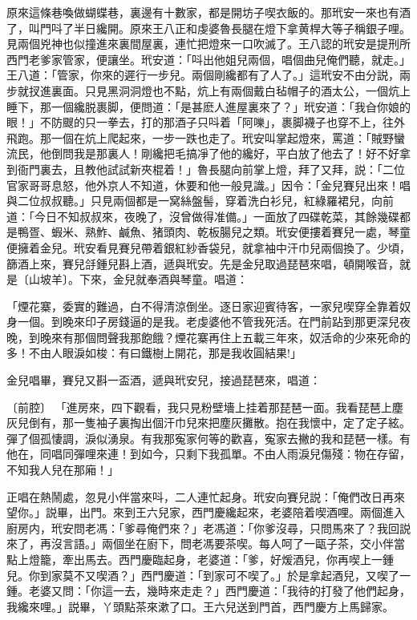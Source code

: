 原來這條巷喚做蝴蝶巷，裏邊有十數家，都是開坊子喫衣飯的。那玳安一來也有酒了，叫門呌了半日纔開。原來王八正和虔婆魯長腿在燈下拿黄桿大等子稱銀子哩。見兩個兇神也似撞進來裏間屋裏，連忙把燈來一口吹滅了。王八認的玳安是提刑所西門老爹家管家，便讓坐。玳安道：「呌出他姐兒兩個，唱個曲兒俺們聽，就走。」王八道：「管家，你來的遲行一步兒。兩個剛纔都有了人了。」這玳安不由分説，兩步就扠進裏面。只見黑洞洞燈也不點，炕上有兩個戴白毡帽子的酒太公，一個炕上睡下，那一個纔脱裹脚，便問道：「是甚麽人進屋裏來了？」玳安道：「我㒲你娘的眼！」不防颼的只一拳去，打的那酒子只呌着「阿嚛」，裹脚襪子也穿不上，往外飛跑。那一個在炕上爬起來，一步一跌也走了。玳安叫掌起燈來，罵道：「賊野蠻流民，他倒問我是那裏人！剛纔把毛搞凈了他的纔好，平白放了他去了！好不好拿到衙門裏去，且教他試試新夾棍着！」魯長腿向前掌上燈，拜了又拜，説：「二位官家哥哥息怒，他外京人不知道，休要和他一般見識。」因令：「金兒賽兒出來！唱與二位叔叔聽。」只見兩個都是一窝絲盤髻，穿着洗白衫兒，紅綠羅裙兒，向前道：「今日不知叔叔來，夜晚了，沒曾做得准備。」一面放了四碟乾菜，其餘幾碟都是鴨疍、蝦米、熟鮓、鹹魚、猪頭肉、乾板腸兒之類。玳安便摟着賽兒一處，琴童便擁着金兒。玳安看見賽兒帶着銀紅紗香袋兒，就拿袖中汗巾兒兩個換了。少頃，篩酒上來，賽兒㧱鍾兒斟上酒，遞與玳安。先是金兒取過琵琶來唱，頓開喉音，就是〔山坡羊〕。下來，金兒就奉酒與琴童。唱道：

\begin{myquote}
「煙花寨，委實的難過，白不得清涼倒坐。逐日家迎賓待客，一家兒喫穿全靠着奴身一個。到晚來印子房錢逼的是我。老虔婆他不管我死活。在門前跕到那更深兒夜晚，到晚來有那個問聲我那飽餓？煙花寨再住上五載三年來，奴活命的少來死命的多！不由人眼淚如梭：有曰鐵樹上開花，那是我收圓結果!」
\end{myquote}

金兒唱畢，賽兒又斟一盃酒，遞與玳安兒，接過琵琶來，唱道：

\begin{myquote}
{\markfont〔前腔〕}
「進房來，四下觀看，我只見粉壁墻上挂着那琵琶一面。我看琵琶上塵灰兒倒有，那一隻袖子裏掏出個汗巾兒來把塵灰攤散。抱在我懷中，定了定子絃。彈了個孤悽調，淚似湧泉。有我那寃家何等的歡喜，寃家去撇的我和琵琶一樣。有他在，同唱同彈哩來連！到如今，只剩下我孤單。不由人雨淚兒傷殘：物在存留，不知我人兒在那廂！」
\end{myquote}

正唱在熱鬧處，忽見小伴當來呌，二人連忙起身。玳安向賽兒説：「俺們改日再來望你。」説畢，出門。來到王六兒家，西門慶纔起來，老婆陪着喫酒哩。兩個進入廚房内，玳安問老馮：「爹尋俺們來？」老馮道：「你爹沒尋，只問馬來了？我回説來了，再沒言語。」兩個坐在廚下，問老馮要茶喫。每人呵了一甌子茶，交小伴當點上燈籠，牽出馬去。西門慶臨起身，老婆道：「爹，好煖酒兒，你再喫上一鍾兒。你到家莫不又喫酒？」西門慶道：「到家可不喫了。」於是拿起酒兒，又喫了一鍾。老婆又問：「你這一去，幾時來走走？」西門慶道：「我待的打發了他們起身，我纔來哩。」説畢，丫頭點茶來漱了口。王六兒送到門首，西門慶方上馬歸家。

